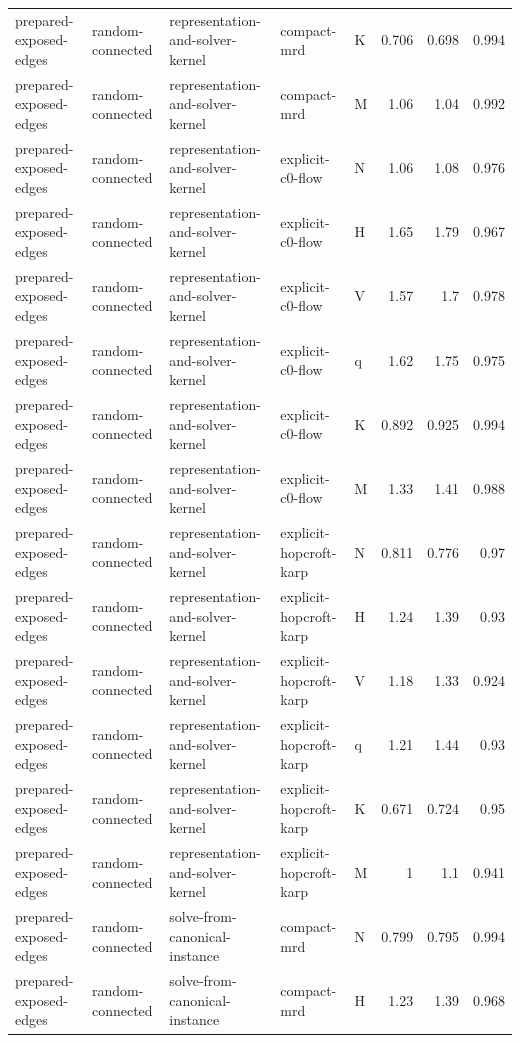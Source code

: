 \begin{table}[t]
\begin{tabular}{lllllrrr}
prepared-exposed-edges & random-connected & representation-and-solver-kernel & compact-mrd & K & 0.706 & 0.698 & 0.994 \\
prepared-exposed-edges & random-connected & representation-and-solver-kernel & compact-mrd & M & 1.06 & 1.04 & 0.992 \\
prepared-exposed-edges & random-connected & representation-and-solver-kernel & explicit-c0-flow & N & 1.06 & 1.08 & 0.976 \\
prepared-exposed-edges & random-connected & representation-and-solver-kernel & explicit-c0-flow & H & 1.65 & 1.79 & 0.967 \\
prepared-exposed-edges & random-connected & representation-and-solver-kernel & explicit-c0-flow & V & 1.57 & 1.7 & 0.978 \\
prepared-exposed-edges & random-connected & representation-and-solver-kernel & explicit-c0-flow & q & 1.62 & 1.75 & 0.975 \\
prepared-exposed-edges & random-connected & representation-and-solver-kernel & explicit-c0-flow & K & 0.892 & 0.925 & 0.994 \\
prepared-exposed-edges & random-connected & representation-and-solver-kernel & explicit-c0-flow & M & 1.33 & 1.41 & 0.988 \\
prepared-exposed-edges & random-connected & representation-and-solver-kernel & explicit-hopcroft-karp & N & 0.811 & 0.776 & 0.97 \\
prepared-exposed-edges & random-connected & representation-and-solver-kernel & explicit-hopcroft-karp & H & 1.24 & 1.39 & 0.93 \\
prepared-exposed-edges & random-connected & representation-and-solver-kernel & explicit-hopcroft-karp & V & 1.18 & 1.33 & 0.924 \\
prepared-exposed-edges & random-connected & representation-and-solver-kernel & explicit-hopcroft-karp & q & 1.21 & 1.44 & 0.93 \\
prepared-exposed-edges & random-connected & representation-and-solver-kernel & explicit-hopcroft-karp & K & 0.671 & 0.724 & 0.95 \\
prepared-exposed-edges & random-connected & representation-and-solver-kernel & explicit-hopcroft-karp & M & 1 & 1.1 & 0.941 \\
prepared-exposed-edges & random-connected & solve-from-canonical-instance & compact-mrd & N & 0.799 & 0.795 & 0.994 \\
prepared-exposed-edges & random-connected & solve-from-canonical-instance & compact-mrd & H & 1.23 & 1.39 & 0.968 \\

\end{tabular}
\end{table}

